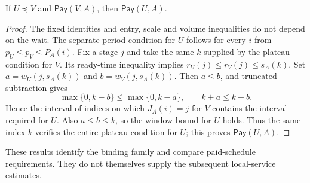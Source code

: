 \begin{lemma}
\label{lem:ex-lattice-paid-weakening}
If $U\preceq V$ and $\mathsf{Pay}(V,A)$, then $\mathsf{Pay}(U,A)$.
\end{lemma}

\begin{proof}
The fixed identities and entry, scale and volume inequalities do not depend
on the wait.  The separate period condition for $U$ follows for every $i$
from $p_U\le p_V\le P_A(i)$.  Fix a stage $j$ and take the same $k$ supplied
by the plateau condition for $V$.  Its ready-time inequality implies
$r_U(j)\le r_V(j)\le s_A(k)$.  Set
$a=w_U(j,s_A(k))$ and $b=w_V(j,s_A(k))$.  Then $a\le b$, and truncated
subtraction gives
\[
 \max\{0,k-b\}\le \max\{0,k-a\},
 \qquad k+a\le k+b.
\]
Hence the interval of indices on which $J_A(i)=j$ for $V$ contains the
interval required for $U$.  Also $a\le b\le k$, so the window bound for $U$
holds.  Thus the same index $k$ verifies the entire plateau condition for
$U$; this proves $\mathsf{Pay}(U,A)$.
\end{proof}

These results identify the binding family and compare paid-schedule
requirements.  They do not themselves supply the subsequent local-service
estimates.
